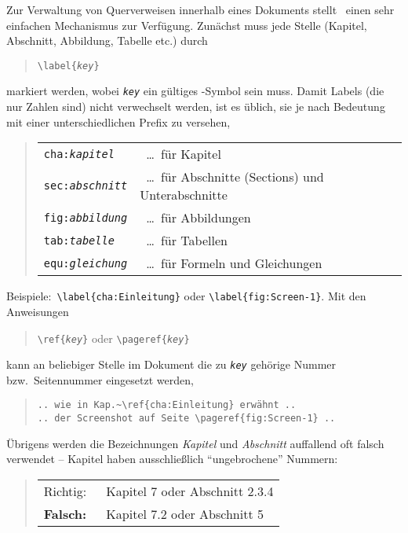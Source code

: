 Zur Verwaltung von Querverweisen innerhalb eines Dokuments stellt
\latex\ einen sehr einfachen Mechanismus zur Verfügung. Zunächst
muss jede Stelle (Kapitel, Abschnitt, Abbildung, Tabelle etc.)
durch
%
\begin{quote}
\verb!\label{!\texttt{\em key}\verb!}!
\end{quote}
%
markiert werden, wobei \texttt{\em key} ein gültiges \latex-Symbol sein
muss. Damit Labels (die nur Zahlen sind) nicht verwechselt werden,
ist es üblich, sie je nach Bedeutung mit einer unterschiedlichen
Prefix zu versehen, \zB\
%
\begin{quote}
\begin{tabular}{ll}
\verb!cha:!\texttt{\em kapitel}   & \ \ldots\ für Kapitel  \\
\verb!sec:!\texttt{\em abschnitt} & \ \ldots\ für Abschnitte (Sections) und Unterabschnitte \\
\verb!fig:!\texttt{\em abbildung} & \ \ldots\ für Abbildungen \\
\verb!tab:!\texttt{\em tabelle}   & \ \ldots\ für Tabellen \\
\verb!equ:!\texttt{\em gleichung} & \ \ldots\ für Formeln und Gleichungen\\
\end{tabular}
\end{quote}
%
\noindent Beispiele:\ \verb!\label{cha:Einleitung}! oder
\verb!\label{fig:Screen-1}!. Mit den Anweisungen
%
\begin{quote}
\verb!\ref{!\texttt{\em key}\verb!}! 
\hspace{1em} oder \hspace{1em} 
\verb!\pageref{!\texttt{\em key}\verb!}!
\end{quote}
%
kann an beliebiger Stelle im Dokument die zu \texttt{\em key} gehörige
Nummer bzw.\ Seitennummer eingesetzt werden, \zB\
%
\begin{quote}
\verb!.. wie in Kap.~\ref{cha:Einleitung} erwähnt ..!\\
\verb!.. der Screenshot auf Seite \pageref{fig:Screen-1} ..!
\end{quote}
%
Übrigens werden die Bezeichnungen \emph{Kapitel} und {\em
Abschnitt} auffallend oft falsch verwendet -- Kapitel haben
ausschließlich "`ungebrochene"' Nummern:
%
\begin{quote}
\begin{tabular}{ll}
   \textrm{Richtig:\ } & Kapitel 7 oder Abschnitt 2.3.4\\
   \textbf{Falsch:\ }  & Kapitel 7.2 oder Abschnitt 5
\end{tabular}
\end{quote}


